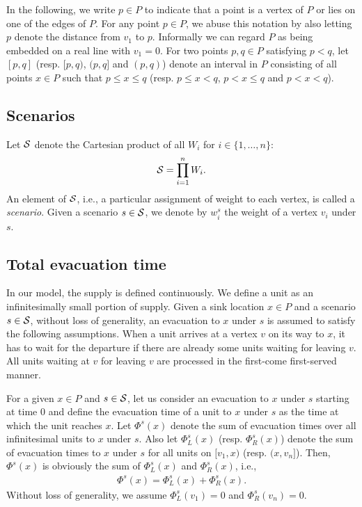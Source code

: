 \documentclass[a4paper]{llncs}
\begin{document}
In the following, we write $p \in P$ to indicate that a point is a vertex of $P$ or lies on one of the edges of $P$.  
For any point $p \in P$,
we abuse this notation by also letting $p$ denote the distance from $v_1$ to $p$. 
Informally we can regard $P$ as being embedded on a real line with $v_1 = 0$.
For two points $p, q \in P$ satisfying $p < q$, 
let $[p, q]$ (resp. $[p, q)$, $(p, q]$ and $(p, q)$) denote an interval in $P$ consisting of all points $x \in P$ 
such that $p \le x \le q$ (resp. $p \le x < q$, $p < x \le q$ and $p < x < q$).

\subsection{Scenarios}
\label{subsec:scn}
Let ${\cal S}$ denote the Cartesian product of all $W_i$ for $i \in \{1, \ldots, n\}$:
\begin{eqnarray}
{\cal S} = \prod_{i=1}^n W_i.
\label{eq:sc}
\end{eqnarray}
An element of ${\cal S}$, i.e., a particular assignment of weight to each vertex, is called a {\it scenario}.
Given a scenario $s \in {\cal S}$, we denote by $w^s_i$ the weight of a vertex $v_i$ under $s$.


\subsection{Total evacuation time}
\label{subsec:to}
In our model, the supply is defined continuously.
We define a unit as an infinitesimally small portion of supply.
Given a sink location $x \in P$ and a scenario $s \in {\cal S}$, 
without loss of generality, an evacuation to $x$ under $s$ is assumed to satisfy the following assumptions.
When a unit arrives at a vertex $v$ on its way to $x$, it has to wait for the departure if there are already some units waiting for leaving $v$. 
All units waiting at $v$ for leaving $v$ are processed in the first-come first-served manner. 

For a given $x \in P$ and $s \in {\cal S}$, let us consider an evacuation to $x$ under $s$ starting at time $0$
and define the evacuation time of a unit to $x$ under $s$ as the time at which the unit reaches $x$.
Let $\Phi^s(x)$ denote the sum of evacuation times over all infinitesimal units to $x$ under $s$.
Also let $\Phi^s_L(x)$ (resp. $\Phi^s_R(x)$) denote the sum of evacuation times to $x$ under $s$ for all units on $[v_1, x)$ (resp. $(x, v_n]$).
Then, $\Phi^s(x)$ is obviously the sum of $\Phi^s_L(x)$ and $\Phi^s_R(x)$, i.e., 
\begin{eqnarray}
\Phi^s(x) = \Phi^s_L(x) + \Phi^s_R(x). \label{eq:ms1}
\end{eqnarray}
Without loss of generality, we assume $\Phi^s_L(v_1) = 0$ and $\Phi^s_R(v_n) = 0$.
\end{document}
